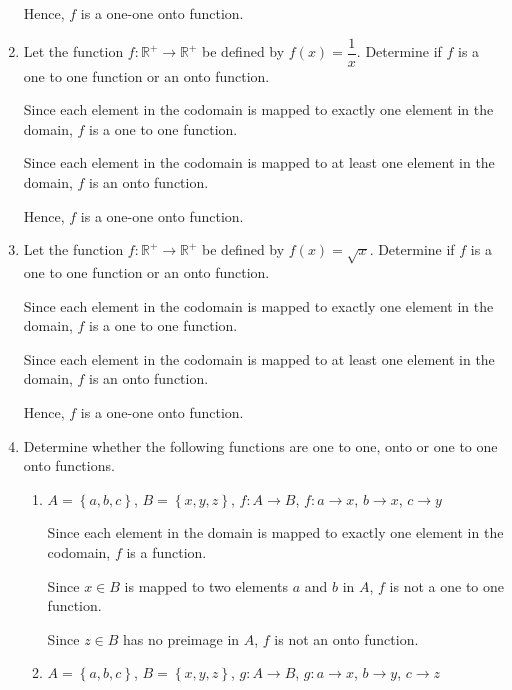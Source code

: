 \documentclass[12pt]{report}
\begin{document}
\begin{enumerate}
        Hence, $f$ is a one-one onto function. \newpage

  \item Let the function $f: \mathbb{R}^+ \to \mathbb{R}^+$ be defined by $f (x) =
          \dfrac{1}{x}$. Determine if $f$ is a one to one function or an onto function.
        \sol{}

        Since each element in the codomain is mapped to exactly one element in the
        domain, $f$ is a one to one function.

        Since each element in the codomain is mapped to at least one element in the
        domain, $f$ is an onto function.

        Hence, $f$ is a one-one onto function.

  \item Let the function $f: \mathbb{R}^+ \to \mathbb{R}^+$ be defined by $f (x) =
          \sqrt{x}$. Determine if $f$ is a one to one function or an onto function.
        \sol{}

        Since each element in the codomain is mapped to exactly one element in the
        domain, $f$ is a one to one function.

        Since each element in the codomain is mapped to at least one element in the
        domain, $f$ is an onto function.

        Hence, $f$ is a one-one onto function.

  \item Determine whether the following functions are one to one, onto or one to one
        onto functions.
        \begin{enumerate}
          \item $A = \left\{a, b, c\right\}$, $B = \left\{x, y, z\right\}$, $f: A \to
                  B$, $f: a \to x$, $b \to x$, $c \to y$
                \sol{}

                Since each element in the domain is mapped to exactly one element in the
                codomain, $f$ is a function.

                Since $x \in B$ is mapped to two elements $a$ and $b$ in $A$, $f$ is not a one
                to one function.

                Since $z \in B$ has no preimage in $A$, $f$ is not an onto function.

          \item $A = \left\{a, b, c\right\}$, $B = \left\{x, y, z\right\}$, $g: A \to
                  B$, $g: a \to x$, $b \to y$, $c \to z$
                \sol{}


\end{enumerate}
\end{enumerate}
\end{document}
